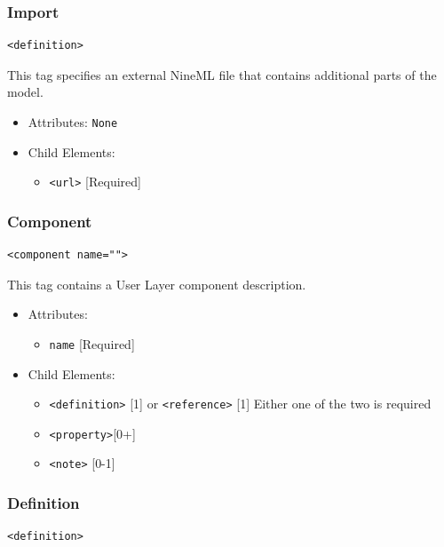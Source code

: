 \documentclass{article}
\begin{document}
\subsubsection{Import}
%
\begin{lstlisting}
<definition>
\end{lstlisting}

This tag specifies an external NineML file that contains additional
parts of the model.

\begin{itemize}
\item Attributes: \texttt{None}

\item Child Elements:
%
\begin{itemize}
\item \verb|<url>| {[}Required{]}
\end{itemize}

\end{itemize}

\subsubsection{Component}
%
\begin{lstlisting}
<component name="">
\end{lstlisting}

This tag contains a User Layer component description.

\begin{itemize}
\item Attributes:
%
\begin{itemize}
\item \verb|name| {[}Required{]}
\end{itemize}

\item Child Elements:
%
\begin{itemize}
\item \verb|<definition>| {[}1{]} or \verb|<reference>| {[}1{]} Either one
of the two is required
\item \verb|<property>|{[}0+{]}
\item \verb|<note>| {[}0-1{]}
\end{itemize}

\end{itemize}

\subsubsection{Definition}
%
\begin{lstlisting}
<definition>
\end{lstlisting}
\end{document}
